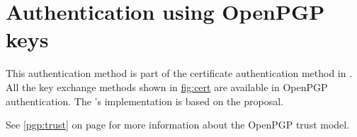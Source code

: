 \section{Authentication using OpenPGP keys}
\label{sec:pgp}

This authentication method is part of the certificate authentication
method in \gnutls{}. All the key exchange methods shown in \hyperref{figure}{figure }{}{fig:cert} are
available in OpenPGP authentication. The \gnutls{}'s implementation is based on the
\cite{TLSPGP} proposal.

See \ref{pgp:trust} on page \pageref{pgp:trust} for more information 
about the OpenPGP trust model.
